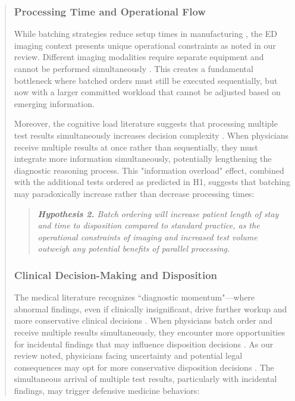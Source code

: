 \documentclass[11pt]{article}
\newcommand{\1}{\hbox{\rm 1\kern-.35em 1}}
\begin{document}
\begin{quote}
\subsubsection*{Processing Time and Operational Flow}

While batching strategies reduce setup times in manufacturing \cite{Fowler2022}, the ED imaging context presents unique operational constraints as noted in our review. Different imaging modalities require separate equipment and cannot be performed simultaneously \cite{Jessome2020}. This creates a fundamental bottleneck where batched orders must still be executed sequentially, but now with a larger committed workload that cannot be adjusted based on emerging information.

Moreover, the cognitive load literature suggests that processing multiple test results simultaneously increases decision complexity \cite{kc2013does}. When physicians receive multiple results at once rather than sequentially, they must integrate more information simultaneously, potentially lengthening the diagnostic reasoning process. This "information overload" effect, combined with the additional tests ordered as predicted in H1, suggests that batching may paradoxically increase rather than decrease processing times:

\begin{quote}
\small
\textit{\textbf{Hypothesis 2.} Batch ordering will increase patient length of stay and time to disposition compared to standard practice, as the operational constraints of imaging and increased test volume outweigh any potential benefits of parallel processing.}
\end{quote}

\subsubsection*{Clinical Decision-Making and Disposition}

The medical literature recognizes ``diagnostic momentum"---where abnormal findings, even if clinically insignificant, drive further workup and more conservative clinical decisions \cite{coen2022clinical, featherston2020decision}. When physicians batch order and receive multiple results simultaneously, they encounter more opportunities for incidental findings that may influence disposition decisions \cite{lumbreras2010incidental, berlin2011incidentaloma}. As our review noted, physicians facing uncertainty and potential legal consequences may opt for more conservative disposition decisions \cite{rao2012overuse, lam2020why}. The simultaneous arrival of multiple test results, particularly with incidental findings, may trigger defensive medicine behaviors:


\end{quote}
\end{document}
